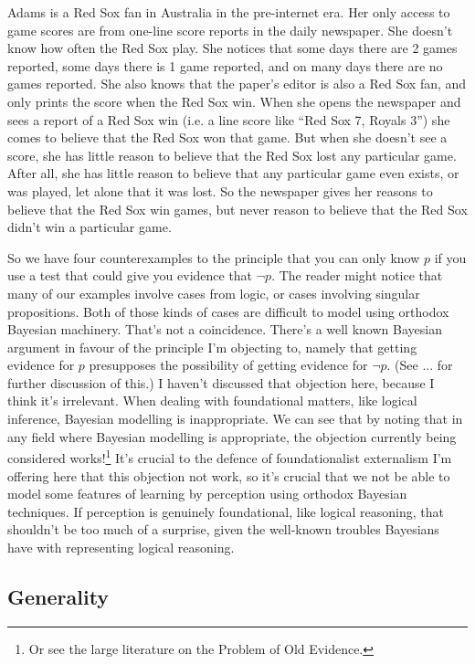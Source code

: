 Adams is a Red Sox fan in Australia in the pre-internet era. Her only access to game scores are from one-line score reports in the daily newspaper. She doesn't know how often the Red Sox play. She notices that some days there are 2 games reported, some days there is 1 game reported, and on many days there are no games reported. She also knows that the paper's editor is also a Red Sox fan, and only prints the score when the Red Sox win. When she opens the newspaper and sees a report of a Red Sox win (i.e. a line score like ``Red Sox 7, Royals 3'') she comes to believe that the Red Sox won that game. But when she doesn't see a score, she has little reason to believe that the Red Sox lost any particular game. After all, she has little reason to believe that any particular game even exists, or was played, let alone that it was lost. So the newspaper gives her reasons to believe that the Red Sox win games, but never reason to believe that the Red Sox didn't win a particular game.

So we have four counterexamples to the principle that you can only know \(p\) if you use a test that could give you evidence that \(\neg p\). The reader might notice that many of our examples involve cases from logic, or cases involving singular propositions. Both of those kinds of cases are difficult to model using orthodox Bayesian machinery. That's not a coincidence. There's a well known Bayesian argument in favour of the principle I'm objecting to, namely that getting evidence for \(p\) presupposes the possibility of getting evidence for \(\neg p\). (See ... for further discussion of this.) I haven't discussed that objection here, because I think it's irrelevant. When dealing with foundational matters, like logical inference, Bayesian modelling is inappropriate. We can see that by noting that in any field where Bayesian modelling is appropriate, the objection currently being considered works!\footnote{Or see the large literature on the Problem of Old Evidence.} It's crucial to the defence of foundationalist externalism I'm offering here that this objection not work, so it's crucial that we not be able to model some features of learning by perception using orthodox Bayesian techniques. If perception is genuinely foundational, like logical reasoning, that shouldn't be too much of a surprise, given the well-known troubles Bayesians have with representing logical reasoning.

\subsection{Generality}

